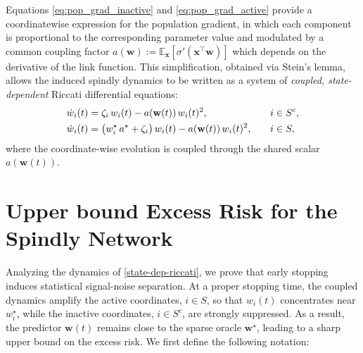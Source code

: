 \documentclass{article}
\theoremstyle{plain}
\theoremstyle{definition}
\theoremstyle{remark}
\begin{document}
Equations \eqref{eq:pop_grad_inactive} and \eqref{eq:pop_grad_active} provide a coordinatewise expression for the population gradient, in which each component is proportional to the corresponding parameter value and modulated by a common coupling factor $a(\mathbf w):= \mathbb E_{\mathbf x}\!\left[\sigma'(\mathbf x^\top \mathbf w)\right]$ which depends on the derivative of the link function.
This simplification, obtained via Stein’s lemma, allows the induced spindly dynamics to be written as a system of \textit{coupled, state-dependent} Riccati differential equations:
\begin{align}
\label{state-dep-riccati}
\dot w_i(t)
&=
\zeta_i\, w_i(t) - a(\mathbf w(t))\, w_i(t)^2,
\quad && i \in S^c,
\notag\\
\dot w_i(t)
&=
\bigl(w_i^\star\, a^\star + \zeta_i\bigr)\, w_i(t)
- a(\mathbf w(t))\, w_i(t)^2,
\quad && i \in S,
\end{align}
where the coordinate-wise evolution is coupled through the shared scalar $a(\mathbf w(t))$. 


\section{Upper bound Excess Risk for the Spindly Network}

Analyzing the dynamics of \eqref{state-dep-riccati}, we prove that early stopping induces statistical
signal-noise separation. At a proper stopping time, the coupled dynamics amplify the active coordinates,
$i \in S$, so that $w_i(t)$ concentrates near $w_i^\star$, while the inactive coordinates,
$i \in S^c$, are strongly suppressed.
As a result, the predictor $\mathbf w(t)$ remains close to the sparse oracle $\mathbf w^\star$,
leading to a sharp upper bound on the excess risk. We first define the following notation:
\end{document}
